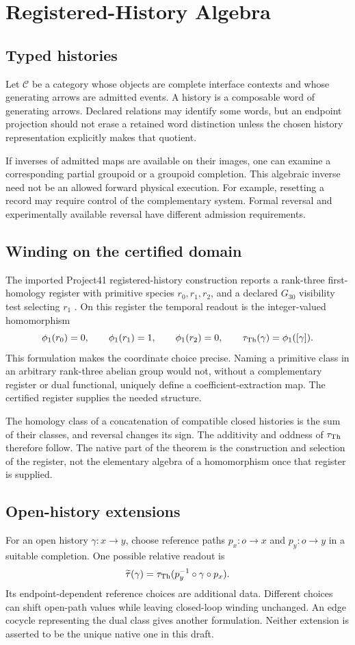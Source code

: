 \section{Registered-History Algebra}
\label{app:history}
\subsection{Typed histories}
Let $\mathscr C$ be a category whose objects are complete interface contexts and whose generating arrows are admitted events. A history is a composable word of generating arrows. Declared relations may identify some words, but an endpoint projection should not erase a retained word distinction unless the chosen history representation explicitly makes that quotient.

If inverses of admitted maps are available on their images, one can examine a corresponding partial groupoid or a groupoid completion. This algebraic inverse need not be an allowed forward physical execution. For example, resetting a record may require control of the complementary system. Formal reversal and experimentally available reversal have different admission requirements.

\subsection{Winding on the certified domain}
The imported Project41 registered-history construction reports a rank-three first-homology register with primitive species $r_0,r_1,r_2$, and a declared $G_{30}$ visibility test selecting $r_1$ \cite[Sec.~17]{cave2026becoming}. On this register the temporal readout is the integer-valued homomorphism
\[
\phi_1(r_0)=0,\qquad\phi_1(r_1)=1,\qquad\phi_1(r_2)=0,
\qquad\tau_{\mathrm{Th}}(\gamma)=\phi_1([\gamma]).
\]
This formulation makes the coordinate choice precise. Naming a primitive class in an arbitrary rank-three abelian group would not, without a complementary register or dual functional, uniquely define a coefficient-extraction map. The certified register supplies the needed structure.

The homology class of a concatenation of compatible closed histories is the sum of their classes, and reversal changes its sign. The additivity and oddness of $\tau_{\mathrm{Th}}$ therefore follow. The native part of the theorem is the construction and selection of the register, not the elementary algebra of a homomorphism once that register is supplied.

\subsection{Open-history extensions}
For an open history $\gamma:x\to y$, choose reference paths $p_x:o\to x$ and $p_y:o\to y$ in a suitable completion. One possible relative readout is
\[
\widetilde\tau(\gamma)=\tau_{\mathrm{Th}}(p_y^{-1}\circ\gamma\circ p_x).
\]
Its endpoint-dependent reference choices are additional data. Different choices can shift open-path values while leaving closed-loop winding unchanged. An edge cocycle representing the dual class gives another formulation. Neither extension is asserted to be the unique native one in this draft.

